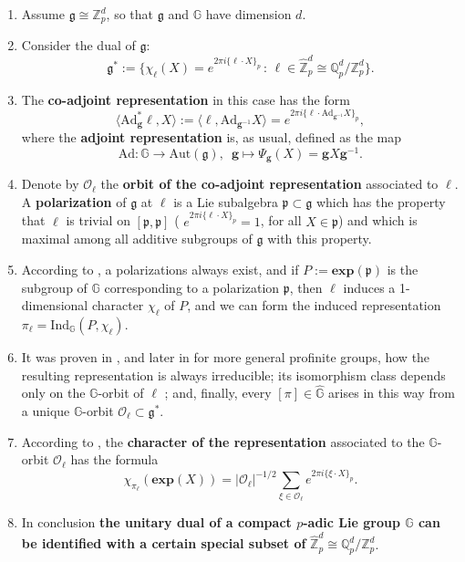 \documentclass[12pt, reqno]{amsart}
\newcommand{\Q}{\mathbb{Q}}
\newcommand{\Z}{\mathbb{Z}}
\newcommand{\1}{\mathds{1}}
\newcommand{\G}{\mathbb{G}}
\newcommand{\g}{\mathfrak{g}}
\begin{document}
\begin{enumerate}
    \item Assume $\g \cong \Z_p^d$, so that $\g$ and $\G$ have dimension $d$. 
    \item Consider the dual of $\g$: $$\g^*:=\{ \chi_\ell (X)=e^{2 \pi i \{ \ell \cdot X  \}_p } \, : \, \ell \in \widehat{\Z}_p^d \cong \Q_p^d / \Z_p^d   \}.$$
    \item The \textbf{co-adjoint representation} in this case has the form $$ \langle \mathrm{Ad}^*_{\mathbf{g}} \ell , X \rangle := \langle  \ell , \mathrm{Ad}_{\mathbf{g}^{-1}} X \rangle = e^{2 \pi i \{ \ell \cdot \mathrm{Ad}_{\mathbf{g}^{-1}}  X  \}_p },$$where the \textbf{adjoint representation} is, as usual, defined as the map $$\mathrm{Ad}: \G \to \mathrm{Aut}(\g), \, \, \, \mathbf{g} \mapsto \Psi_\mathbf{g} (X) = \mathbf{g} X \mathbf{g}^{-1}.$$
    \item Denote by $\mathcal{O}_\ell$ the \textbf{orbit of the co-adjoint representation} associated to $\ell$. A \textbf{polarization} of $\g$ at $\ell$ is a Lie subalgebra $\mathfrak{p} \subset \g$ which has the property that $\ell$ is trivial on $[ \mathfrak{p}, \mathfrak{p} ]$ ( $e^{2 \pi i \{ \ell \cdot X \}_p} =1$, for all $X \in \mathfrak{p}$)  and which is maximal among all additive subgroups of $\g$ with this property.
    \item According to \cite[ Lemma 1.4]{Howe1977}, a polarizations always
    exist, and if $P:= \mathbf{exp}(\mathfrak{p})$ is the subgroup of $\G$ corresponding to a polarization $\mathfrak{p}$, then $\ell$ induces
    a 1-dimensional character $\chi_\ell$ of $P$, and we can form the induced representation $\pi_\ell = \mathrm{Ind}_\G (P, \chi_\ell)$. 
    \item It was proven in \cite[Lemma 1.2]{Howe1977}, and later in \cite{Boyarchenko2008} for more general profinite groups, how the resulting representation is always irreducible; its isomorphism
    class depends only on the $\G$-orbit of $\ell$ ; and, finally, every $[\pi] \in \widehat{\G}$ arises in this way from a unique $\G$-orbit $\mathcal{O}_\ell \subset \g^*$.
    \item According to \cite[Lemma 1.2]{Howe1977}, the \textbf{character of the representation} associated to the $\G$-orbit $\mathcal{O}_\ell$ has the formula $$\chi_{\pi_\ell} (\mathbf{exp}(X)) = |\mathcal{O}_\ell|^{-1/2} \sum_{\xi \in \mathcal{O}_\ell} e^{2 \pi i \{ \xi \cdot X \}_p}.$$  
    \item In conclusion \textbf{the unitary dual of a compact $p$-adic Lie group $\G$ can be identified with a certain special subset of} $\widehat{\Z}_p^d \cong \Q_p^d / \Z_p^d$.
\end{enumerate} 
\end{document}
